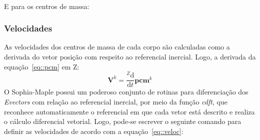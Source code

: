 \medskip {} \\
 \medskip 

E para os centros de massa:

\medskip {} \medskip 


\subsubsection{Velocidades}

As velocidades dos centros de massa de cada corpo são calculadas como a derivada
do vetor posição com respeito ao referencial inercial. Logo, a derivada da
equação~\ref{eq::pcm} em Z:
%
\begin{equation}
	\mathbf{V}^{k} = \frac{^{Z}\mathrm{d} }{\mathrm{d} t}
	\mathbf{pcm}^{k} \label{eq::veloc}
\end{equation}
%
O Sophia-Maple possui um poderoso conjunto de rotinas para diferenciação dos
\textit{Evectors} com relação ao referencial inercial, por meio da função
\textit{cdft}, que reconhece automaticamente o referencial em que cada vetor
está descrito e realiza o cálculo diferencial vetorial. Logo, pode-se escrever o
seguinte comando para definir as velocidades de acordo com a
equação~\ref{eq::veloc}:

\medskip {} \medskip 

